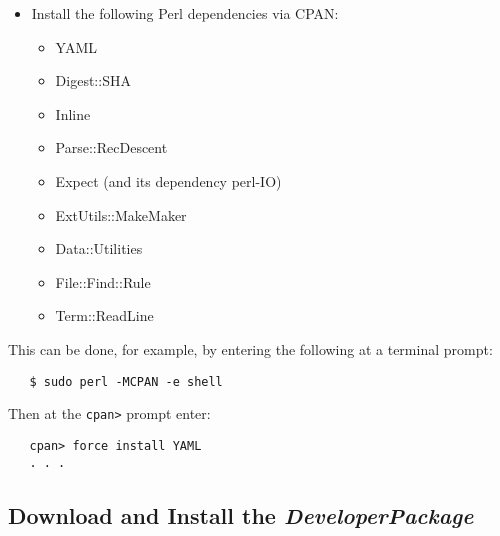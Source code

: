 \documentclass[12pt]{article}
\begin{document}
\begin{itemize}
 {\bf Note:} Compiling from source will only produce executables and libraries for the host architecture. For example if you have a 64-bit system and 32-bit {\bf Perl}, the compiled {\bf SWIG} libraries will not load, giving an error similar to this:

{\bf Note:} For information on how to properly compile Universal Binaries for OS X, see \href{http://developer.apple.com/library/mac/#technotes/tn2005/tn2137.html}{this link}.

\begin{verbatim}
	./SwiggableHeccer.dylib: mach-o, but wrong architecture at /System/Library/Perl/5.10.0/darwin-thread-multi-2level/DynaLoader.pm
\end{verbatim}
   
so when compiling on a machine make sure that {\bf Perl}, {\bf Python} and all of their loadable modules and libraries are of the same architecture as the host machine.

   \item[]Install the following Perl dependencies via CPAN:
      \begin{itemize}
         \item YAML
         \item Digest::SHA
         \item Inline
         \item Parse::RecDescent
         \item Expect (and its dependency perl-IO)
         \item ExtUtils::MakeMaker
         \item Data::Utilities
         \item File::Find::Rule
         \item Term::ReadLine
      \end{itemize}
   \end{itemize}
This can be done, for example, by entering the following at a terminal prompt:
\begin{verbatim}
   $ sudo perl -MCPAN -e shell
\end{verbatim}
Then at the {\tt cpan>} prompt enter:
\begin{verbatim}
   cpan> force install YAML
   . . . 
\end{verbatim}
   
\subsection*{Download and Install the {\it DeveloperPackage}}
\end{document}
